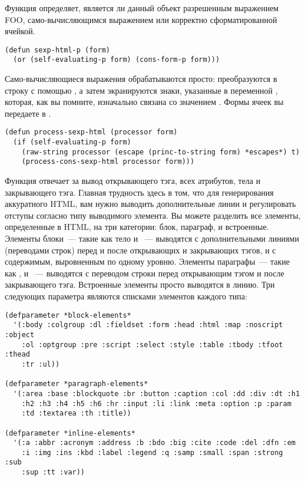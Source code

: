 Функция  определяет, является ли данный объект разрешенным выражением
FOO, само-вычисляющимся выражением или корректно сформатированной ячейкой.

\begin{lstlisting}
(defun sexp-html-p (form)
  (or (self-evaluating-p form) (cons-form-p form)))
\end{lstlisting}

Само-вычисляющиеся выражения обрабатываются просто: преобразуются в строку с помощью
, а затем экранируются знаки, указанные в переменной
, которая, как вы помните, изначально связана со значением
. Формы ячеек вы передаете в .

\begin{lstlisting}
(defun process-sexp-html (processor form)
  (if (self-evaluating-p form)
    (raw-string processor (escape (princ-to-string form) *escapes*) t)
    (process-cons-sexp-html processor form)))
\end{lstlisting}

Функция  отвечает за вывод открывающего тэга, всех атрибутов,
тела и закрывающего тэга. Главная трудность здесь в том, что для генерирования аккуратного
HTML, вам нужно выводить дополнительные линии и регулировать отступы согласно типу
выводимого элемента. Вы можете разделить все элементы, определенные в HTML, на три
категории: блок, параграф, и встроенные. Элементы блоки~--- такие как тело и ~---
выводятся с дополнительными линиями (переводами строк) перед и после открывающих и
закрывающих тэгов, и с содержимым, выровненным по одному уровню. Элементы параграфы~---
такие как ,  и ~--- выводятся с переводом строки перед
открывающим тэгом и после закрывающего тэга. Встроенные элементы просто выводятся в
линию. Три следующих параметра являются списками элементов каждого типа:

\begin{lstlisting}
(defparameter *block-elements*
  '(:body :colgroup :dl :fieldset :form :head :html :map :noscript :object
    :ol :optgroup :pre :script :select :style :table :tbody :tfoot :thead
    :tr :ul))

(defparameter *paragraph-elements*
  '(:area :base :blockquote :br :button :caption :col :dd :div :dt :h1
    :h2 :h3 :h4 :h5 :h6 :hr :input :li :link :meta :option :p :param
    :td :textarea :th :title))

(defparameter *inline-elements*
  '(:a :abbr :acronym :address :b :bdo :big :cite :code :del :dfn :em
    :i :img :ins :kbd :label :legend :q :samp :small :span :strong :sub
    :sup :tt :var))
\end{lstlisting}

